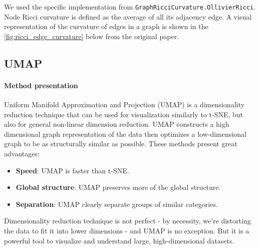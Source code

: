 \documentclass{article}
\theoremstyle{plain}
\theoremstyle{definition}
\theoremstyle{remark}
\begin{document}
We used the specific implementation from \texttt{GraphRicciCurvature.OllivierRicci}. 
Node Ricci curvature is defined as the average of all its adjacency edge. A visual
representation of the curvature of edges in a graph is shown in the \ref{fig:ricci_edge_curvature} below 
from the original paper.


\subsection{UMAP}
\paragraph{Method presentation}
Uniform Manifold Approximation and Projection (UMAP) is a dimensionality 
reduction technique that can be used for visualization similarly to t-SNE,
but also for general non-linear dimension reduction.
UMAP constructs a high dimensional graph representation of the data 
then optimizes a low-dimensional graph to be as structurally similar as possible.
These methods present great advantages:

\begin{itemize}
    \item \textbf{Speed}: UMAP is faster than t-SNE.
    \item \textbf{Global structure}: UMAP preserves more of the global structure.
    \item \textbf{Separation}: UMAP clearly separate groups of similar categories.
\end{itemize}
Dimensionality reduction technique is not perfect - by necessity, we're distorting
 the data to fit it into lower dimensions - and UMAP is no exception. 
 But it is a powerful tool to visualize and understand large, high-dimensional datasets.
\end{document}
